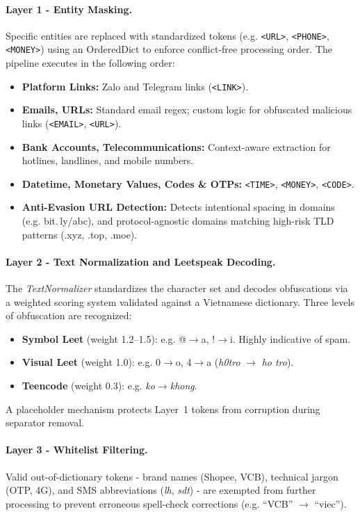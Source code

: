 \documentclass[conference]{IEEEtran}
\begin{document}
\paragraph{Layer 1 - Entity Masking.}
Specific entities are replaced with standardized tokens (e.g. \texttt{<URL>},
\texttt{<PHONE>}, \texttt{<MONEY>}) using an OrderedDict to enforce
conflict-free processing order. The pipeline executes in the following order:
\begin{itemize}
    \item \textbf{Platform Links:} Zalo and Telegram links (\texttt{<LINK>}).
    \item \textbf{Emails, URLs:} Standard email regex; custom logic for
          obfuscated malicious links (\texttt{<EMAIL>}, \texttt{<URL>}).
    \item \textbf{Bank Accounts, Telecommunications:} Context-aware
          extraction for hotlines, landlines, and mobile numbers.
    \item \textbf{Datetime, Monetary Values, Codes \& OTPs:}
          \texttt{<TIME>}, \texttt{<MONEY>}, \texttt{<CODE>}.
    \item \textbf{Anti-Evasion URL Detection:} Detects intentional spacing
          in domains (e.g. bit.\,ly/abc), and protocol-agnostic
          domains matching high-risk TLD patterns (.xyz, .top, .moe).
\end{itemize}

\paragraph{Layer 2 - Text Normalization and Leetspeak Decoding.}
The \textit{TextNormalizer} standardizes the character set and decodes
obfuscations via a weighted scoring system validated against a Vietnamese
dictionary. Three levels of obfuscation are recognized:
\begin{itemize}
    \item \textbf{Symbol Leet} (weight 1.2--1.5): e.g. @$\to$a,
          !$\to$i. Highly indicative of spam.
    \item \textbf{Visual Leet} (weight 1.0): e.g. 0$\to$o,
          4$\to$a (\textit{h0tro} $\to$ \textit{ho tro}).
    \item \textbf{Teencode} (weight 0.3): e.g. \textit{ko}$\to$\textit{khong}.
\end{itemize}
A placeholder mechanism protects Layer~1 tokens from corruption during
separator removal.

\paragraph{Layer 3 - Whitelist Filtering.}
Valid out-of-dictionary tokens - brand names (Shopee, VCB), technical jargon
(OTP, 4G), and SMS abbreviations (\textit{lh}, \textit{sdt}) - are exempted
from further processing to prevent erroneous spell-check corrections
(e.g. ``VCB'' $\to$ ``viec'').
\end{document}
